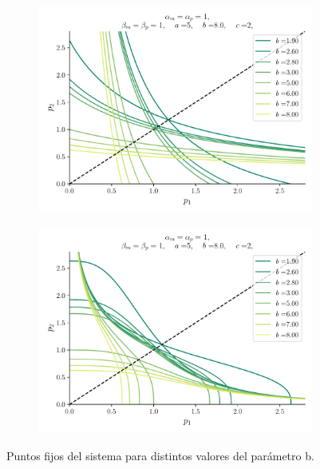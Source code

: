 \documentclass[twocolumn,aps,prl]{revtex4-1}
\begin{document}
\begin{figure}[ht!]
  \centering
  \begin{subfigure}[b]{0.49\linewidth}
    \centering
    \includegraphics[width = 0.999\textwidth]{figuras/ex02-cosa1-3.pdf}
    \caption{}
    \label{fig:figuras/ex02-cosa1-3}
\end{subfigure}\quad
  \begin{subfigure}[b]{0.49\linewidth}
      \centering
      \includegraphics[width = 0.999\textwidth]{figuras/ex02-cosa1-2.pdf}
      \caption{}
      \label{fig:figuras/ex02-cosa1-2}
  \end{subfigure}\quad
  \caption{Puntos fijos del sistema para distintos valores del parámetro b.}
  \label{fig:figuras/ex02-puntos fijos}
\end{figure}
\end{document}
